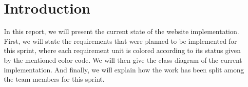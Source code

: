 \section{Introduction}

In this report, we will present the current state of the website implementation. First, we will state the requirements that were planned to be implemented for this sprint, where each requirement unit is colored according to its status given by the mentioned color code. We will then give the class diagram of the current implementation. And finally, we will explain how the work has been split among the team members for this sprint.
